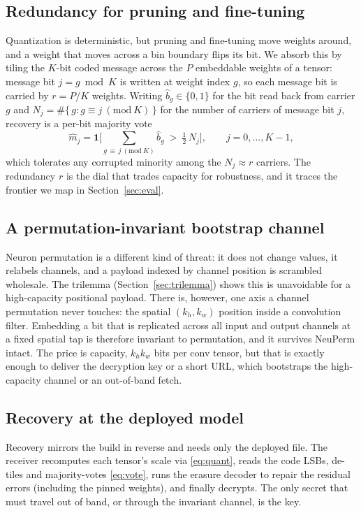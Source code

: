 \documentclass[10pt,journal]{IEEEtran}
\theoremstyle{remark}
\begin{document}
\subsection{Redundancy for pruning and fine-tuning}\label{sec:redund}
Quantization is deterministic, but pruning and fine-tuning move weights around, and a
weight that moves across a bin boundary flips its bit. We absorb this by tiling the
$K$-bit coded message across the $P$ embeddable weights of a tensor: message bit
$j=g\bmod K$ is written at weight index $g$, so each message bit is carried by $r=P/K$
weights. Writing $\hat b_g\in\{0,1\}$ for the bit read back from carrier $g$ and
$N_j=\#\{\,g : g\equiv j\ (\mathrm{mod}\ K)\,\}$ for the number of carriers of message
bit $j$, recovery is a per-bit majority vote
\begin{equation}\label{eq:vote}
\hat m_j=\mathbf 1\!\Big[\textstyle\sum_{g\,\equiv\, j\ (\mathrm{mod}\ K)} \hat b_g
\ >\ \tfrac12\,N_j\Big],\qquad j=0,\dots,K-1,
\end{equation}
which tolerates any corrupted minority among the $N_j\approx r$ carriers. The redundancy
$r$ is the dial that trades capacity for robustness, and it traces the frontier we map in
Section~\ref{sec:eval}.

\subsection{A permutation-invariant bootstrap channel}
Neuron permutation is a different kind of threat: it does not change values, it
relabels channels, and a payload indexed by channel position is scrambled wholesale.
The trilemma (Section~\ref{sec:trilemma}) shows this is unavoidable for a high-capacity
positional payload. There is, however, one axis a channel permutation never touches:
the spatial $(k_h,k_w)$ position inside a convolution filter. Embedding a bit that is
replicated across all input and output channels at a fixed spatial tap is therefore
invariant to permutation, and it survives NeuPerm intact. The price is capacity,
$k_h k_w$ bits per conv tensor, but that is exactly enough to deliver the decryption
key or a short URL, which bootstraps the high-capacity channel or an out-of-band fetch.

\subsection{Recovery at the deployed model}
Recovery mirrors the build in reverse and needs only the deployed file. The receiver
recomputes each tensor's scale via \eqref{eq:quant}, reads the code LSBs, de-tiles and
majority-votes \eqref{eq:vote}, runs the erasure decoder to repair the residual errors
(including the pinned weights), and finally decrypts. The only secret that must travel
out of band, or through the invariant channel, is the key.
\end{document}
